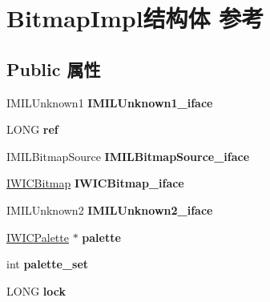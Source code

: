 \hypertarget{struct_bitmap_impl}{}\section{Bitmap\+Impl结构体 参考}
\label{struct_bitmap_impl}
\subsection*{Public 属性}
\begin{DoxyCompactItemize}
\item 
\mbox{\label{struct_bitmap_impl_a34b60aff0982f38c3338107113474f75}} 
I\+M\+I\+L\+Unknown1 {\bfseries I\+M\+I\+L\+Unknown1\+\_\+iface}
\item 
\mbox{\label{struct_bitmap_impl_a074435de98035f67985bfc3187777c53}} 
L\+O\+NG {\bfseries ref}
\item 
\mbox{\label{struct_bitmap_impl_a0e8d6f555470ac2d7774661a0754f242}} 
I\+M\+I\+L\+Bitmap\+Source {\bfseries I\+M\+I\+L\+Bitmap\+Source\+\_\+iface}
\item 
\mbox{\label{struct_bitmap_impl_a5a07d88f3978dd1b74c9fa928a4203cb}} 
\hyperlink{interface_i_w_i_c_bitmap}{I\+W\+I\+C\+Bitmap} {\bfseries I\+W\+I\+C\+Bitmap\+\_\+iface}
\item 
\mbox{\label{struct_bitmap_impl_a383b81f2892926dc326e398b6aed9987}} 
I\+M\+I\+L\+Unknown2 {\bfseries I\+M\+I\+L\+Unknown2\+\_\+iface}
\item 
\mbox{\label{struct_bitmap_impl_a50fc753466dd25ca3c6452b77a25bb5f}} 
\hyperlink{interface_i_w_i_c_palette}{I\+W\+I\+C\+Palette} $\ast$ {\bfseries palette}
\item 
\mbox{\label{struct_bitmap_impl_a47a1e160c4a259a8676e03e180e337be}} 
int {\bfseries palette\+\_\+set}
\item 
\mbox{\label{struct_bitmap_impl_a148bf6ae5aa8f52882287ea2a1441cf1}} 
L\+O\+NG {\bfseries lock}
\item 
\mbox{\label{struct_bitmap_impl_a95b75cc6aa7a8738ef4febea88ec5a99}} 

\end{DoxyCompactItemize}
